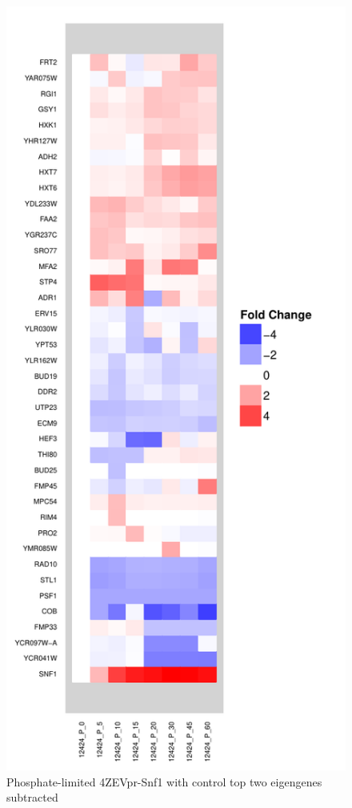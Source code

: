 \documentclass[letter]{article}\usepackage{graphicx, color}
\makeatletter
\def\maxwidth{ %
  \ifdim\Gin@nat@width>\linewidth
    \linewidth
  \else
    \Gin@nat@width
  \fi
}
\newenvironment{knitrout}{}{} %
\makeatother
\begin{document}
\begin{figure}
\centering
\begin{knitrout}
\color{fgcolor}\includegraphics[width=\maxwidth]{figure/p9} 
\end{knitrout}

\caption{Phosphate-limited 4ZEVpr-Snf1 with control top two eigengenes subtracted}
\end{figure}
\end{document}
